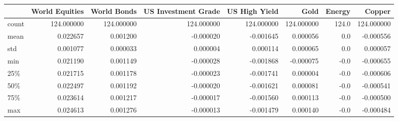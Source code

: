 \begin{tabular}{lrrrrrrr}
\toprule
{} &  World Equities &  World Bonds &  US Investment Grade &  US High Yield &        Gold &  Energy &      Copper \\
\midrule
count &      124.000000 &   124.000000 &           124.000000 &     124.000000 &  124.000000 &   124.0 &  124.000000 \\
mean  &        0.022657 &     0.001200 &            -0.000020 &      -0.001645 &    0.000056 &     0.0 &   -0.000556 \\
std   &        0.001077 &     0.000033 &             0.000004 &       0.000114 &    0.000065 &     0.0 &    0.000057 \\
min   &        0.021190 &     0.001149 &            -0.000028 &      -0.001868 &   -0.000075 &    -0.0 &   -0.000655 \\
25\%   &        0.021715 &     0.001178 &            -0.000023 &      -0.001741 &    0.000004 &    -0.0 &   -0.000606 \\
50\%   &        0.022497 &     0.001192 &            -0.000020 &      -0.001621 &    0.000081 &    -0.0 &   -0.000541 \\
75\%   &        0.023614 &     0.001217 &            -0.000017 &      -0.001560 &    0.000113 &    -0.0 &   -0.000500 \\
max   &        0.024613 &     0.001276 &            -0.000013 &      -0.001479 &    0.000140 &    -0.0 &   -0.000484 \\
\bottomrule
\end{tabular}
